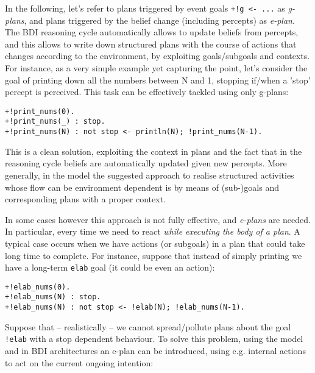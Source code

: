 %
%
%
In the following, let's refer to plans triggered by event goals \texttt{+!g <- ...} as \emph{g-plans}, and plans triggered by the belief change (including percepts) as \emph{e-plan}.
%
The BDI reasoning cycle automatically allows to update beliefs from percepts, and this allows to write down structured plans with the course of actions that changes according to the environment, by exploiting goals/subgoals and contexts.
%
For instance, as a very simple example yet capturing the point, let's consider the goal of  printing down all the numbers between N and 1, stopping if/when a 'stop' percept is perceived. 
%
This task can be effectively tackled using only g-plans:

\begin{small}
\begin{verbatim}
+!print_nums(0).
+!print_nums(_) : stop.
+!print_nums(N) : not stop <- println(N); !print_nums(N-1).
\end{verbatim}
\end{small}
	
\noindent This is a clean solution, exploiting the context in plans  and the fact that in the reasoning cycle beliefs are automatically updated given new percepts.
%
More generally,  in the {\asl} model the suggested approach to realise structured activities whose flow can be environment dependent is by means of (sub-)goals and corresponding plans with a proper context.

In some cases however this approach is not fully effective, and \emph{e-plans} are needed. 
%
In particular, every time we need to react \emph{while executing the body of a plan}. 
%
A typical case occurs when we have actions (or subgoals) in a plan that could take long time to complete.
%
For instance, suppose that instead of simply printing we have a long-term \texttt{elab} goal (it could be even an action):

\begin{small}
\begin{verbatim}
+!elab_nums(0).
+!elab_nums(N) : stop. 
+!elab_nums(N) : not stop <- !elab(N); !elab_nums(N-1).
\end{verbatim}
\end{small}

\noindent Suppose that -- realistically -- we cannot spread/pollute plans about the goal \texttt{!elab} with a stop dependent behaviour.
%
To solve this problem, using the {\asl} model and in BDI architectures an e-plan can be introduced, using e.g. internal actions to act on the current ongoing intention:

